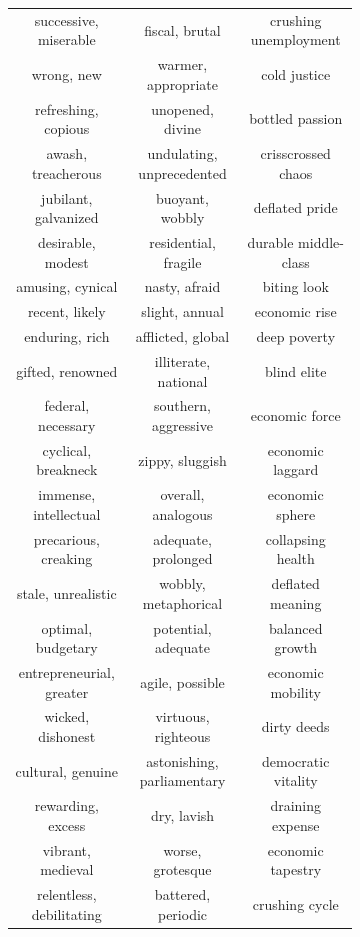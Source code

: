 \documentclass[OpenMind]{stjour}
\begin{document}
\begin{figure}
\begin{subfigure}{0.3\textwidth}
\begin{center}
\begin{tabular}{ c | c | c  }
			\tiny successive, miserable & \tiny fiscal, brutal & \tiny crushing unemployment\\
			\tiny wrong, new & \tiny warmer, appropriate & \tiny cold justice\\
			\tiny refreshing, copious & \tiny unopened, divine & \tiny bottled passion\\
			\tiny awash, treacherous & \tiny undulating, unprecedented & \tiny crisscrossed chaos\\
			\tiny jubilant, galvanized & \tiny buoyant, wobbly & \tiny deflated pride\\
			\tiny desirable, modest & \tiny residential, fragile & \tiny durable middle-class\\
			\tiny amusing, cynical & \tiny nasty, afraid & \tiny biting look\\
			\tiny recent, likely & \tiny slight, annual & \tiny economic rise\\
			\tiny enduring, rich & \tiny afflicted, global & \tiny deep poverty\\
			\tiny gifted, renowned & \tiny illiterate, national & \tiny blind elite\\
			\tiny federal, necessary & \tiny southern, aggressive & \tiny economic force\\
			\tiny cyclical, breakneck & \tiny zippy, sluggish & \tiny economic laggard\\
			\tiny immense, intellectual & \tiny overall, analogous & \tiny economic sphere\\
			\tiny precarious, creaking & \tiny adequate, prolonged & \tiny collapsing health\\
			\tiny stale, unrealistic & \tiny wobbly, metaphorical & \tiny deflated meaning\\
			\tiny optimal, budgetary & \tiny potential, adequate & \tiny balanced growth\\
			\tiny entrepreneurial, greater & \tiny agile, possible & \tiny economic mobility\\
			\tiny wicked, dishonest & \tiny virtuous, righteous & \tiny dirty deeds\\
			\tiny cultural, genuine & \tiny astonishing, parliamentary & \tiny democratic vitality\\
			\tiny rewarding, excess & \tiny dry, lavish & \tiny draining expense\\
			\tiny vibrant, medieval & \tiny worse, grotesque & \tiny economic tapestry\\
			\tiny relentless, debilitating & \tiny battered, periodic & \tiny crushing cycle\\

\end{tabular}
\end{center}
\end{subfigure}
\end{figure}
\end{document}

